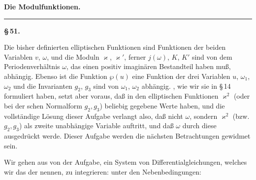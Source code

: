 \begin{center}

\textbf{Die Modulfunktionen.}

\rule{2cm}{0.4pt}

\textbf{\S\,51. }
\end{center}

Die bisher definierten elliptischen Funktionen sind Funktionen der beiden Variablen $v$, $\omega$, und die Moduln $\varkappa$, $\varkappa'$, ferner $j(\omega)$, $K$, $K'$ sind von dem Periodenverhältnis $\omega$, das einen positiv imaginären Bestandteil haben muß, abhängig. Ebenso ist die Funktion $\wp(u)$ eine Funktion der drei Variablen $u$, $\omega_1$, $\omega_2$ und die Invarianten $g_2$, $g_3$ sind von $\omega_1$, $\omega_2$ abhängig. , wie wir sie in \S\,14 formuliert haben, setzt aber voraus, daß in den elliptischen Funktionen $\varkappa^2$ (oder bei der schen Normalform $g_2, g_3$) beliebig gegebene Werte haben, und die vollständige Lösung dieser Aufgabe verlangt also, daß nicht $\omega$, sondern $\varkappa^2$ (bzw. $g_2, g_3$) als zweite unabhängige Variable auftritt, und daß $\omega$ durch diese ausgedrückt werde. Dieser Aufgabe werden die nächsten Betrachtungen gewidmet sein.

Wir gehen aus von der Aufgabe, ein System von Differentialgleichungen, welches wir das der  nennen, zu integrieren:
unter den Nebenbedingungen:

